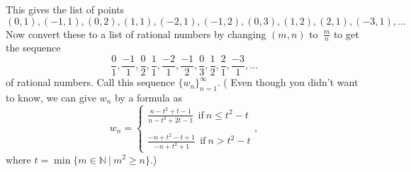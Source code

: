 \documentclass[12pt]{amsart}
\newcommand{\N}{\mathbb{N}}
\numberwithin{equation}{section}
\theoremstyle{plain} %
\theoremstyle{definition}
\theoremstyle{remark}
\begin{document}
	
\noindent	This gives the list of points
	$$
	(0,1),  (-1,1), (0,2), (1,1), (-2,1), (-1,2), (0,3), (1,2), (2,1), (-3,1), \dots
	$$
	Now convert these to a list of rational numbers by changing $(m,n)$ to~$\frac{m}{n}$ to get the sequence
	$$
	\frac01, \frac{-1}1, \frac02, \frac11, \frac{-2}1, \frac{-1}2, \frac03, \frac12, \frac21, \frac{-3}1, \dots
	$$
	of rational numbers.  Call this
	sequence $\{ w_n\}_{n=1}^\infty$.
	( Even though you didn't want to know, we can give $w_n$ by a formula as
	\[ w_n = \displaystyle \begin{cases} \displaystyle \frac{n-t^2 + t -1}{n-t^2 + 2t - 1} \ \ \text{if} \ n\leq t^2 - t \\ \\  \displaystyle \frac{-n+t^2 - t +1}{-n+t^2 + 1}\ \ \text{if} \ n> t^2 - t\end{cases},\] where $t=\min\{ m\in \N \ | \ m^2 \geq n\}.$)
\end{document}
